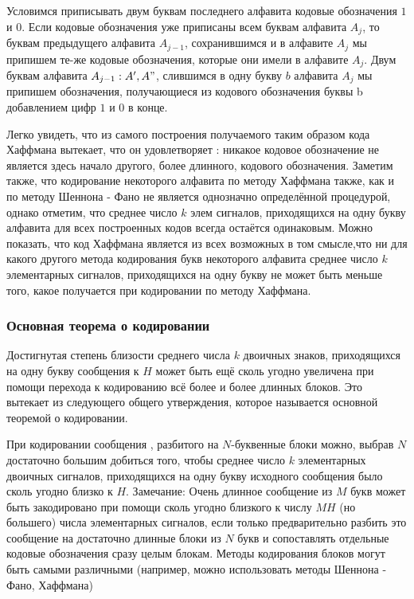 ﻿\documentclass[a4paper,12pt]{report}
\begin{document}
	Условимся приписывать двум буквам последнего алфавита кодовые обозначения $1$ и $0$. Если кодовые обозначения уже приписаны всем буквам алфавита $A_j$, то буквам предыдущего алфавита $A_{j-1}$, сохранившимся и в алфавите $A_j$ мы припишем те-же кодовые обозначения, которые они имели в алфавите $A_j$. Двум буквам алфавита $A_{j-1}: A',A"$, слившимся в одну букву $b$ алфавита $A_j$ мы припишем обозначения, получающиеся из кодового обозначения буквы b добавлением цифр $1$ и $0$ в конце. 


Легко увидеть, что из самого построения получаемого таким образом кода Хаффмана вытекает, что он удовлетворяет : никакое кодовое обозначение не является здесь начало другого, более длинного, кодового обозначения. Заметим также, что кодирование некоторого алфавита по методу Хаффмана также, как и по методу Шеннона - Фано не является однозначно определённой процедурой, однако отметим, что среднее число $k$ элем сигналов, приходящихся на одну букву алфавита для всех построенных кодов всегда остаётся одинаковым.
	Можно показать, что код Хаффмана является  из всех возможных в том смысле,что ни для какого другого метода кодирования букв некоторого алфавита среднее число $k$ элементарных сигналов, приходящихся на одну букву не может быть меньше того, какое получается при кодировании по методу Хаффмана.
	
	

\subsubsection{Основная теорема о кодировании}

	Достигнутая степень близости среднего числа $k$ двоичных знаков, приходящихся на одну букву сообщения к $H$ может быть ещё сколь угодно увеличена при помощи перехода к кодированию всё более и более длинных блоков. Это вытекает из следующего общего утверждения, которое называется основной теоремой о кодировании.
	
	 При кодировании сообщения , разбитого на $N$-буквенные блоки можно, выбрав $N$ достаточно большим добиться того, чтобы среднее число $k$ элементарных двоичных сигналов, приходящихся на одну букву исходного сообщения было сколь угодно близко к $H$.
	Замечание: Очень длинное сообщение из $M$ букв может быть закодировано при помощи сколь угодно близкого к числу $MH$ (но большего) числа элементарных сигналов, если только предварительно разбить это сообщение на достаточно длинные блоки из $N$ букв и сопоставлять отдельные кодовые обозначения сразу целым блокам.
	Методы кодирования блоков могут быть самыми различными (например, можно использовать методы Шеннона - Фано, Хаффмана)
	
\end{document}
